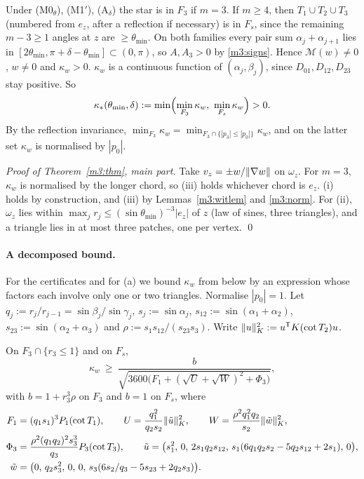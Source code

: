 Under (M0$_\theta$), (M1$'$), (A$_\delta$) the star is in $F_3$ if $m=3$. If $m\ge4$, then $T_1\cup T_2\cup T_3$ (numbered from $e_z$, after a reflection if necessary) is in $F_s$, since the remaining $m-3\ge1$ angles at $z$ are $\ge\theta_{\min}$. On both families every pair sum $\alpha_j+\alpha_{j+1}$ lies in $[2\theta_{\min},\pi+\delta-\theta_{\min}]\subset(0,\pi)$, so $A,A_3>0$ by \eqref{m3:signs}. Hence $\mathcal M(w)\ne0$, $w\ne0$ and $\kappa_w>0$. $\kappa_w$ is a continuous function of $(\alpha_j,\beta_j)$, since $D_{01},D_{12},D_{23}$ stay positive. So
\[
\kappa_\ast(\theta_{\min},\delta):=\min\Bigl(\min_{F_3}\kappa_w,\ \min_{F_s}\kappa_w\Bigr)>0 .
\]
By the reflection invariance, $\min_{F_3}\kappa_w=\min_{F_3\cap\{|p_3|\le|p_0|\}}\kappa_w$, and on the latter set $\kappa_w$ is normalised by $|p_0|$.

\emph{Proof of Theorem~\ref{m3:thm}, main part.} Take $v_z=\pm w/\lVert \nabla w\rVert$ on $\omega_z$. For $m=3$, $\kappa_w$ is normalised by the longer chord, so (iii) holds whichever chord is $e_z$. (i) holds by construction, and (iii) by Lemmas~\ref{m3:witlem} and \ref{m3:norm}. For (ii), $\omega_z$ lies within $\max_jr_j\le(\sin\theta_{\min})^{-3}|e_z|$ of $z$ (law of sines, three triangles), and a triangle lies in at most three patches, one per vertex. \qed

\paragraph{A decomposed bound.}
For the certificates and for (a) we bound $\kappa_w$ from below by an expression whose factors each involve only one or two triangles. Normalise $|p_0|=1$. Let $q_j:=r_j/r_{j-1}=\sin\beta_j/\sin\gamma_j$, $s_j:=\sin\alpha_j$, $s_{12}:=\sin(\alpha_1+\alpha_2)$, $s_{23}:=\sin(\alpha_2+\alpha_3)$ and $\rho:=s_1s_{12}/(s_{23}s_3)$. Write $\lVert u\rVert_K^2:=u^{\mathsf T}K(\cot T_2)u$.

\begin{lemma}[Decomposition]\label{m3:dec}
On $F_3\cap\{r_3\le1\}$ and on $F_s$,
\[
\kappa_w\ \ge\ \frac{b}{\sqrt{3600\bigl(F_1+(\sqrt U+\sqrt W)^2+\Phi_3\bigr)}},
\]
with $b=1+r_3^3\rho$ on $F_3$ and $b=1$ on $F_s$, where
\begin{align*}
F_1&=(q_1s_1)^3P_1(\cot T_1),\qquad U=\frac{q_1^2}{q_2s_2}\lVert \tilde u\rVert_K^2,\qquad W=\frac{\rho^2q_1^2q_2}{s_2}\lVert \tilde w\rVert_K^2,\\
\Phi_3&=\frac{\rho^2(q_1q_2)^2s_3^3}{q_3}P_3(\cot T_3),\qquad \tilde u=\bigl(s_1^2,\,0,\,2s_1q_2s_{12},\,s_1(6q_1q_2s_2-5q_2s_{12}+2s_1),\,0\bigr),\\
\tilde w&=\bigl(0,\,q_2s_3^2,\,0,\,0,\,s_3(6s_2/q_3-5s_{23}+2q_2s_3)\bigr).
\end{align*}
\end{lemma}

